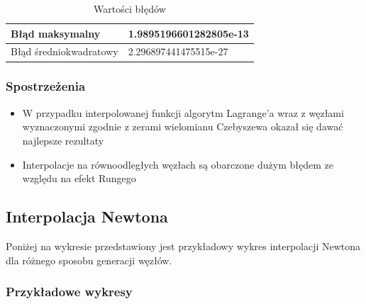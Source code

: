 \documentclass{article}
\begin{document}
\begin{table}[!ht]
    \centering
    \begin{tabular}{|l|l|}
    \hline
        Błąd maksymalny & 1.9895196601282805e-13 \\ \hline
        Błąd średniokwadratowy & 2.296897441475515e-27 \\ \hline
    \end{tabular}
    \caption{Wartości błędów}
\end{table}

\subsubsection{Spostrzeżenia}

\begin{itemize}
    \item W przypadku interpolowanej funkcji algorytm Lagrange'a wraz z węzłami wyznaczonymi zgodnie z zerami wielomianu Czebyszewa okazał się dawać najlepsze rezultaty
    \item Interpolacje na równoodległych węzłach są obarczone dużym błędem ze względu na efekt Rungego
\end{itemize}

\subsection{Interpolacja Newtona}

\noindent
Poniżej na wykresie przedstawiony jest przykładowy wykres interpolacji Newtona dla różnego sposobu generacji węzłów.

\subsubsection{Przykładowe wykresy}
\end{document}
